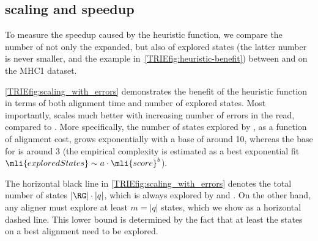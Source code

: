 \subsection{\A scaling and speedup}
To measure the speedup caused by the heuristic function, we compare the number
of not only the expanded, but also of explored states (the latter number is
never smaller, and the example in~\cref{TRIEfig:heuristic-benefit}) between
\astarix and \dijkstra on the MHC1 dataset.

\cref{TRIEfig:scaling_with_errors} demonstrates the benefit of the heuristic
function in terms of both alignment time and number of explored states. Most
importantly, \astarix scales much better with increasing number of errors in the
read, compared to \dijkstra. More specifically, the number of states explored by
\dijkstra, as a function of alignment cost, grows exponentially with a base of 
around 10, whereas the base for \astarix is around 3 (the empirical complexity is
estimated as a best exponential fit \mbox{$\mli{exploredStates} \sim a \cdot
\mli{score}^b$}).

The horizontal black line in \cref{TRIEfig:scaling_with_errors} denotes the total
number of states $\lvert \RG \rvert \cdot \lvert q \rvert$, which is always
explored by \bitparallel and \pasgal. On the other hand, any aligner must
explore at least $m = \lvert q \rvert$ states, which we show as a horizontal
dashed line. This lower bound is determined by the fact that at least the states
on a best alignment need to be explored.

